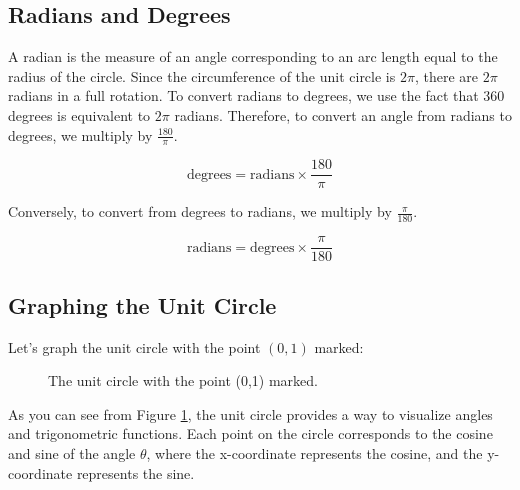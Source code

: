 \documentclass[a4paper,12pt]{book}
\begin{document}
\subsection{Radians and Degrees}
\label{subsec:radians_degrees}

A radian is the measure of an angle corresponding to an arc length equal to the radius of the circle. Since the circumference of the unit circle is \(2\pi\), there are \(2\pi\) radians in a full rotation. To convert radians to degrees, we use the fact that \(360\) degrees is equivalent to \(2\pi\) radians. Therefore, to convert an angle from radians to degrees, we multiply by \(\frac{180}{\pi}\).

\[
\text{degrees} = \text{radians} \times \frac{180}{\pi}
\]

Conversely, to convert from degrees to radians, we multiply by \(\frac{\pi}{180}\).

\[
\text{radians} = \text{degrees} \times \frac{\pi}{180}
\]

\subsection{Graphing the Unit Circle}
\label{subsec:graphing_unit_circle}

Let's graph the unit circle with the point \((0,1)\) marked:

\begin{figure}[ht!]
\centering
{}
\caption{The unit circle with the point (0,1) marked.}
\label{fig:unit_circle}
\end{figure}

As you can see from Figure \ref{fig:unit_circle}, the unit circle provides a way to visualize angles and trigonometric functions. Each point on the circle corresponds to the cosine and sine of the angle \(\theta\), where the x-coordinate represents the cosine, and the y-coordinate represents the sine.

\end{document}
